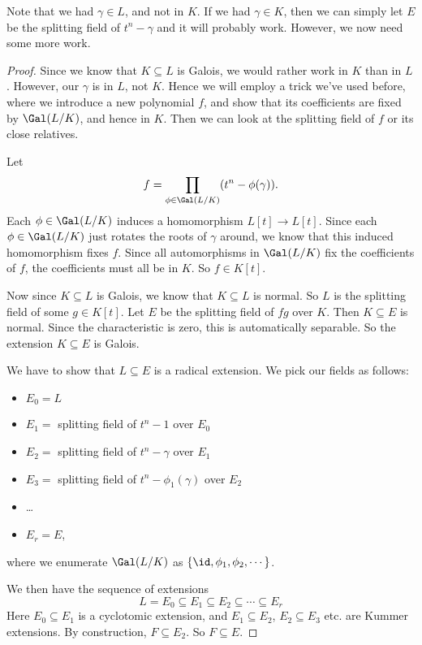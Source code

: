 \documentclass[a4paper]{article}
\begin{document}
Note that we had $\gamma \in L$, and not in $K$. If we had $\gamma \in K$, then we can simply let $E$ be the splitting field of $t^n - \gamma$ and it will probably work. However, we now need some more work.
\begin{proof}
  Since we know that $K\subseteq L$ is Galois, we would rather work in $K$ than in $L$. However, our $\gamma$ is in $L$, not $K$. Hence we will employ a trick we've used before, where we introduce a new polynomial $f$, and show that its coefficients are fixed by $\Gal(L/K)$, and hence in $K$. Then we can look at the splitting field of $f$ or its close relatives.

  Let
  \[
    f = \prod_{\phi \in \Gal(L/K)} (t^n - \phi(\gamma)).
  \]
  Each $\phi \in \Gal(L/K)$ induces a homomorphism $L[t] \to L[t]$. Since each $\phi \in \Gal(L/K)$ just rotates the roots of $\gamma$ around, we know that this induced homomorphism fixes $f$. Since all automorphisms in $\Gal(L/K)$ fix the coefficients of $f$, the coefficients must all be in $K$. So $f \in K[t]$.

  Now since $K\subseteq L$ is Galois, we know that $K\subseteq L$ is normal. So $L$ is the splitting field of some $g \in K[t]$. Let $E$ be the splitting field of $fg$ over $K$. Then $K\subseteq E$ is normal. Since the characteristic is zero, this is automatically separable. So the extension $K\subseteq E$ is Galois.

  We have to show that $L \subseteq E$ is a radical extension. We pick our fields as follows:
  \begin{itemize}
    \item $E_0 = L$
    \item $E_1 = $ splitting field of $t^n - 1$ over $E_0$
    \item $E_2 = $ splitting field of $t^n - \gamma$ over $E_1$
    \item $E_3 = $ splitting field of $t^n - \phi_1(\gamma)$ over $E_2$
    \item \ldots
    \item $E_r = E$,
  \end{itemize}
  where we enumerate $\Gal(L/K)$ as $\{\id , \phi_1, \phi_2, \cdots\}$.

  We then have the sequence of extensions
  \[
    L = E_0 \subseteq E_1 \subseteq E_2 \subseteq \cdots \subseteq E_r
  \]
  Here $E_0 \subseteq E_1$ is a cyclotomic extension, and $E_1 \subseteq E_2$, $E_2 \subseteq E_3$ etc. are Kummer extensions. By construction, $F \subseteq E_2$. So $F\subseteq E$.
\end{proof}
\end{document}
